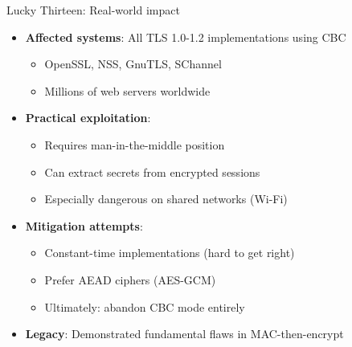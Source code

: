 \documentclass[aspectratio=169, lualatex, handout]{beamer}
\begin{document}
\begin{frame}{Lucky Thirteen: Real-world impact}
	\begin{itemize}
		\item \textbf{Affected systems}: All TLS 1.0-1.2 implementations using CBC
		      \begin{itemize}
			      \item OpenSSL, NSS, GnuTLS, SChannel
			      \item Millions of web servers worldwide
		      \end{itemize}
		\item \textbf{Practical exploitation}:
		      \begin{itemize}
			      \item Requires man-in-the-middle position
			      \item Can extract secrets from encrypted sessions
			      \item Especially dangerous on shared networks (Wi-Fi)
		      \end{itemize}
		\item \textbf{Mitigation attempts}:
		      \begin{itemize}
			      \item Constant-time implementations (hard to get right)
			      \item Prefer AEAD ciphers (AES-GCM)
			      \item Ultimately: abandon CBC mode entirely
		      \end{itemize}
		\item \textbf{Legacy}: Demonstrated fundamental flaws in MAC-then-encrypt
	\end{itemize}
\end{frame}
\end{document}
